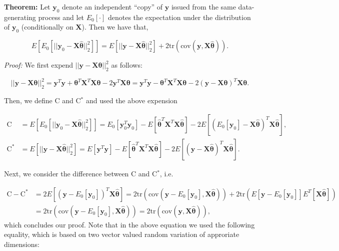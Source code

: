\documentclass[]{book}
\theoremstyle{definition}
\theoremstyle{definition}
\theoremstyle{definition}
\theoremstyle{remark}
\begin{document}
{\textbf{Theorem:} Let \(\mathbf{y}_0\) denote an independent ``copy'' of
\(\mathbf{y}\) issued from the same data-generating process and let
\(E_0[\cdot]\) denotes the expectation under the distribution of
\(\mathbf{y}_0\) (conditionally on \(\mathbf{X}\)). Then we have that,

\[E \left[ E_0 \left[ || \mathbf{y}_0 - \mathbf{X}\hat{\boldsymbol{\theta}}||_2^2 \right] \right] = E \left[ || \mathbf{y} - \mathbf{X}\hat{\boldsymbol{\theta}}||_2^2 \right] + 2 \text{tr} \left( \text{cov} \left(\mathbf{y}, \mathbf{X} \hat{\boldsymbol{\theta}} \right)\right).\]

\emph{Proof:} We first expend
\(|| \mathbf{y} - \mathbf{X}{\boldsymbol{\theta}}||_2^2\) as follows:

\[|| \mathbf{y} - \mathbf{X}{\boldsymbol{\theta}}||_2^2 = \mathbf{y}^T \mathbf{y} + \boldsymbol{\theta}^T \mathbf{X}^T \mathbf{X} \boldsymbol{\theta} - 2 \mathbf{y}^T \mathbf{X} \boldsymbol{\theta} = \mathbf{y}^T \mathbf{y} - \boldsymbol{\theta}^T \mathbf{X}^T \mathbf{X} \boldsymbol{\theta} - 2 \left(\mathbf{y} - \mathbf{X}\boldsymbol{\theta}\right)^T \mathbf{X} \boldsymbol{\theta}. \]

Then, we define C and C\(^\ast\) and used the above expension

\[\begin{aligned}
\text{C} &= E \left[ E_0 \left[ || \mathbf{y}_0 - \mathbf{X}\hat{\boldsymbol{\theta}}||_2^2 \right] \right] =  E_0 \left[ \mathbf{y}_0^T \mathbf{y}_0 \right] - E \left[ \hat{\boldsymbol{\theta}}^T \mathbf{X}^T \mathbf{X} \hat{\boldsymbol{\theta}}\right] - 2 E \left[\left(E_0 \left[ \mathbf{y}_0\right] - \mathbf{X}\hat{\boldsymbol{\theta}}\right)^T \mathbf{X} \hat{\boldsymbol{\theta}}\right],\\
\text{C}^\ast &= E \left[ || \mathbf{y} - \mathbf{X}\hat{\boldsymbol{\theta}}||_2^2 \right] =  E \left[ \mathbf{y}^T \mathbf{y} \right] - E \left[ \hat{\boldsymbol{\theta}}^T \mathbf{X}^T \mathbf{X} \hat{\boldsymbol{\theta}}\right] - 2 E \left[\left( \mathbf{y} - \mathbf{X}\hat{\boldsymbol{\theta}}\right)^T \mathbf{X} \hat{\boldsymbol{\theta}}\right].
\end{aligned}\]

Next, we consider the difference between C and C\(^\ast\), i.e.

\[\begin{aligned} 
\text{C} - \text{C}^\ast &= 2 E \left[\left( \mathbf{y} - E_0 \left[ \mathbf{y}_0\right]\right)^T \mathbf{X} \hat{\boldsymbol{\theta}}\right] = 2 \text{tr} \left( \text{cov} \left(\mathbf{y} - E_0 [\mathbf{y}_0], \mathbf{X} \hat{\boldsymbol{\theta}} \right)\right) + 2 \text{tr} \left(E \left[\mathbf{y} - E_0 [\mathbf{y}_0] \right] E^T [\mathbf{X} \hat{\boldsymbol{\theta}}]\right) \\
&= 2 \text{tr} \left( \text{cov} \left(\mathbf{y} - E_0 [\mathbf{y}_0], \mathbf{X} \hat{\boldsymbol{\theta}} \right)\right) = 2 \text{tr} \left( \text{cov} \left(\mathbf{y}, \mathbf{X} \hat{\boldsymbol{\theta}} \right)\right),
\end{aligned}
\] which concludes our proof. Note that in the above equation we used
the following equality, which is based on two vector valued random
variation of approriate dimensions:

}
\end{document}
